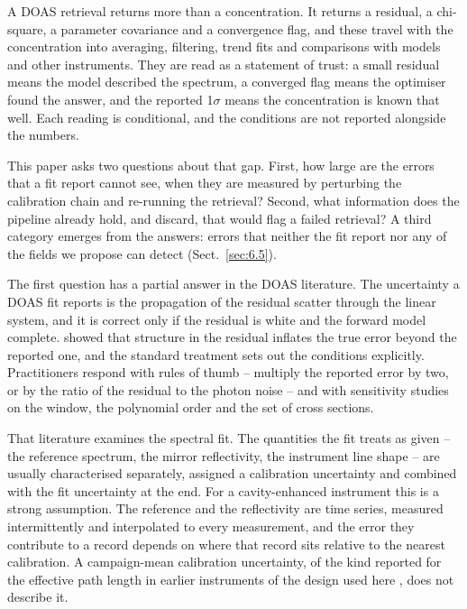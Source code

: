 \introduction
\label{sec:1}

A DOAS retrieval returns more than a concentration. It returns a residual, a chi-square, a parameter covariance and a
convergence flag, and these travel with the concentration into averaging, filtering, trend fits and comparisons with
models and other instruments. They are read as a statement of trust: a small residual means the model described the spectrum, a converged flag
means the optimiser found the answer, and the reported 1$\sigma$ means the concentration is known that well. Each reading is conditional, and the conditions are not reported
alongside the numbers.

This paper asks two questions about that gap. First, how large are the errors that a fit report cannot see, when they
are measured by perturbing the calibration chain and re-running the retrieval? Second, what information does the
pipeline already hold, and discard, that would flag a failed retrieval? A third category emerges from the answers:
errors that neither the fit report nor any of the fields we propose can detect (Sect.~\ref{sec:6.5}).

The first question has a partial answer in the DOAS literature. The uncertainty a DOAS fit reports is the propagation
of the residual scatter through the linear system, and it is correct only if the residual is white and the forward
model complete. \citet{Stutz_1996} showed that structure in the residual inflates the true error beyond the reported
one, and the standard treatment \citep{Platt} sets out the conditions explicitly. Practitioners respond with rules of
thumb -- multiply the reported error by two, or by the ratio of the residual to the photon noise -- and with
sensitivity studies on the window, the polynomial order and the set of cross sections.

That literature examines the spectral fit. The quantities the fit treats as given -- the reference spectrum, the
mirror reflectivity, the instrument line shape -- are usually characterised separately, assigned a calibration
uncertainty and combined with the fit uncertainty at the end. For a cavity-enhanced instrument this is a strong
assumption. The reference and the reflectivity are time series, measured intermittently and interpolated to every
measurement, and the error they contribute to a record depends on where that record sits relative to the nearest
calibration. A campaign-mean calibration uncertainty, of the kind reported for the effective path length in earlier
instruments of the design used here \citep{Min_2016,Nam_2022}, does not describe it.

